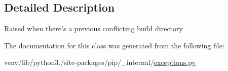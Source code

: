 \subsection{Detailed Description}
\begin{DoxyVerb}Raised when there's a previous conflicting build directory\end{DoxyVerb}
 

The documentation for this class was generated from the following file\+:\begin{DoxyCompactItemize}
\item 
venv/lib/python3./site-\/packages/pip/\+\_\+internal/\hyperlink{pip_2__internal_2exceptions_8py}{exceptions.\+py}\end{DoxyCompactItemize}
